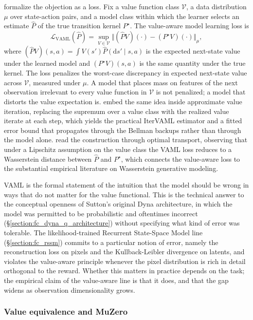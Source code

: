 \citet{FarahmandVAML2017} formalize the objection as a loss. Fix a value function class $\mathcal{V}$, a data distribution $\mu$ over state-action pairs, and a model class within which the learner selects an estimate $\widehat P$ of the true transition kernel $P^\star$. The value-aware model learning loss is
\[ \mathcal{L}_{\text{VAML}}(\widehat P) = \sup_{V \in \mathcal{V}} \Big\Vert (\widehat P V)(\cdot) - (P^\star V)(\cdot) \Big\Vert_\mu, \]
where $(\widehat P V)(s, a) = \int V(s') \widehat P(\mathrm{d} s' \mid s, a)$ is the expected next-state value under the learned model and $(P^\star V)(s, a)$ is the same quantity under the true kernel. The loss penalizes the worst-case discrepancy in expected next-state value across $\mathcal{V}$, measured under $\mu$. A model that places mass on features of the next observation irrelevant to every value function in $\mathcal{V}$ is not penalized; a model that distorts the value expectation is. \citet{FarahmandIterVAML2018} embed the same idea inside approximate value iteration, replacing the supremum over a value class with the realized value iterate at each step, which yields the practical IterVAML estimator and a fitted error bound that propagates through the Bellman backups rather than through the model alone. \citet{AsadiWasserstein2018} read the construction through optimal transport, observing that under a Lipschitz assumption on the value class the VAML loss reduces to a Wasserstein distance between $\widehat P$ and $P^\star$, which connects the value-aware loss to the substantial empirical literature on Wasserstein generative modeling.

VAML is the formal statement of the intuition that the model should be wrong in ways that do not matter for the value functional. This is the technical answer to the conceptual openness of Sutton's original Dyna architecture, in which the model was permitted to be probabilistic and oftentimes incorrect (\S\ref{section:fc_dyna_q_architecture}) without specifying what kind of error was tolerable. The likelihood-trained Recurrent State-Space Model line (\S\ref{section:fc_rssm}) commits to a particular notion of error, namely the reconstruction loss on pixels and the Kullback-Leibler divergence on latents, and violates the value-aware principle whenever the pixel distribution is rich in detail orthogonal to the reward. Whether this matters in practice depends on the task; the empirical claim of the value-aware line is that it does, and that the gap widens as observation dimensionality grows.

\subsubsection{Value equivalence and MuZero}
\label{section:fc_value_aware_ve}

